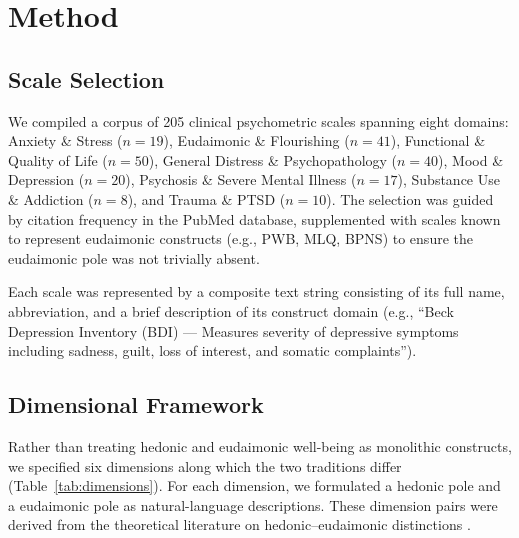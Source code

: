 \documentclass[12pt,a4paper]{article}
\begin{document}
\section{Method}\label{sec:method}

\subsection{Scale Selection}\label{sec:scales}

We compiled a corpus of 205 clinical psychometric scales spanning eight domains: Anxiety \& Stress ($n = 19$), Eudaimonic \& Flourishing ($n = 41$), Functional \& Quality of Life ($n = 50$), General Distress \& Psychopathology ($n = 40$), Mood \& Depression ($n = 20$), Psychosis \& Severe Mental Illness ($n = 17$), Substance Use \& Addiction ($n = 8$), and Trauma \& PTSD ($n = 10$).
The selection was guided by citation frequency in the PubMed database, supplemented with scales known to represent eudaimonic constructs (e.g., PWB, MLQ, BPNS) to ensure the eudaimonic pole was not trivially absent.

Each scale was represented by a composite text string consisting of its full name, abbreviation, and a brief description of its construct domain (e.g., ``Beck Depression Inventory (BDI) --- Measures severity of depressive symptoms including sadness, guilt, loss of interest, and somatic complaints'').

\subsection{Dimensional Framework}\label{sec:dimensions}

Rather than treating hedonic and eudaimonic well-being as monolithic constructs, we specified six dimensions along which the two traditions differ (Table~\ref{tab:dimensions}).
For each dimension, we formulated a hedonic pole and a eudaimonic pole as natural-language descriptions.
These dimension pairs were derived from the theoretical literature on hedonic--eudaimonic distinctions
\citep{ryan2001happiness, waterman1993eudaimonia, huta2010pursuing, kashdan2008reconsidering}.
\end{document}
